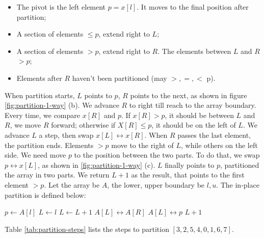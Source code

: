 \documentclass[b5paper]{article}
\begin{document}
\begin{itemize}
\item The pivot is the left element $p = x[l]$. It moves to the final position after partition;
\item A section of elements $\leq p$, extend right to $L$;
\item A section of elements $> p$, extend right to $R$. The elements between $L$ and $R$ $> p$;
\item Elements after $R$ haven't been partitioned (may $>, =, <$ p).
\end{itemize}

When partition starts, $L$ points to $p$, $R$ points to the next, as shown in figure \cref{fig:partition-1-way} (b). We advance $R$ to right till reach to the array boundary. Every time, we compare $x[R]$ and $p$. If $x[R] > p$, it should be between $L$ and $R$, we move $R$ forward; otherwise if $X[R] \leq p$, it should be on the left of $L$. We advance $L$ a step, then swap $x[L] \leftrightarrow x[R]$. When $R$ passes the last element, the partition ends. Elements $> p$ move to the right of $L$, while others on the left side. We need move $p$ to the position between the two parts. To do that, we swap $p \leftrightarrow x[L]$, as shown in \cref{fig:partition-1-way} (c). $L$ finally points to $p$, partitioned the array in two parts. We return $L + 1$ as the result, that points to the first element $> p$. Let the array be $A$, the lower, upper boundary be $l, u$. The in-place partition is defined below:

\begin{algorithmic}[1]
  \State $p \gets A[l]$  
  \State $L \gets l$ 
   
      \State $L \gets L + 1$
      \State {} $A[L] \leftrightarrow A[R]$
    \EndIf
  \EndFor
  \State {} $A[L] \leftrightarrow p$
  \State \Return $L + 1$ 
\EndFunction
\end{algorithmic}

Table \cref{tab:partition-steps} lists the steps to partition $[3, 2, 5, 4, 0, 1, 6, 7]$.
\end{document}
